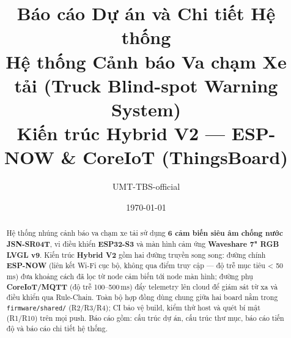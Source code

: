 \documentclass[a4paper,12pt]{report}
\title{\textbf{Báo cáo Dự án và Chi tiết Hệ thống\\[6pt]
\large Hệ thống Cảnh báo Va chạm Xe tải (Truck Blind-spot Warning System)\\
Kiến trúc Hybrid V2 — ESP-NOW \& CoreIoT (ThingsBoard)}}
\author{UMT-TBS-official}
\date{\today}
\newcommand{\code}[1]{\texttt{#1}}
\begin{document}
\maketitle

\begin{abstract}
\noindent
Hệ thống nhúng cảnh báo va chạm xe tải sử dụng \textbf{6 cảm biến siêu âm chống nước
JSN-SR04T}, vi điều khiển \textbf{ESP32-S3} và màn hình cảm ứng \textbf{Waveshare 7"
RGB LVGL v9}. Kiến trúc \textbf{Hybrid V2} gồm hai đường truyền song song: đường chính
\textbf{ESP-NOW} (liên kết Wi-Fi cục bộ, không qua điểm truy cập — độ trễ mục tiêu
\textless{} 50\,ms) đưa khoảng cách đã lọc từ node cảm biến tới node màn hình; đường phụ
\textbf{CoreIoT/MQTT} (độ trễ 100--500\,ms) đẩy telemetry lên cloud để giám sát từ xa và
điều khiển qua Rule-Chain. Toàn bộ hợp đồng dùng chung giữa hai board nằm trong
\code{firmware/shared/} (R2/R3/R4); CI bảo vệ build, kiểm thử host và quét bí mật
(R1/R10) trên mọi push. Báo cáo gồm: cấu trúc dự án, cấu trúc thư mục, báo cáo tiến độ
và báo cáo chi tiết hệ thống.
\end{abstract}

\tableofcontents
\newpage

\end{document}
